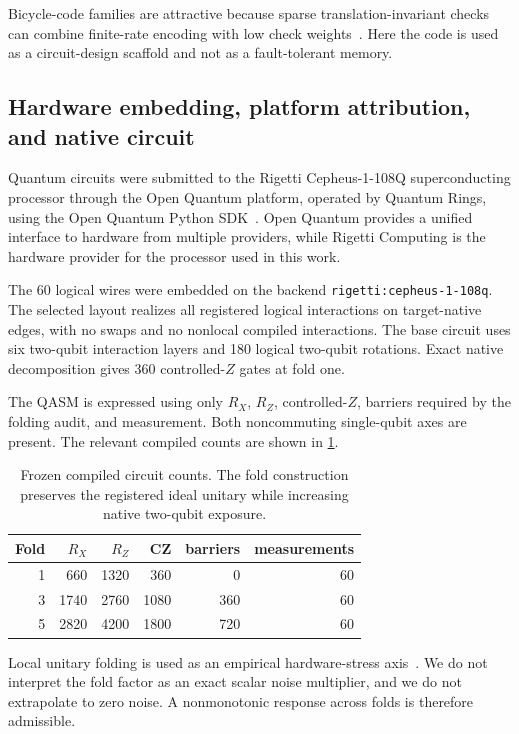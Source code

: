\documentclass[11pt]{article}
\begin{document}
Bicycle-code families are attractive because sparse translation-invariant checks can combine finite-rate encoding with low check weights~\cite{bravyi2024bicycle}. Here the code is used as a circuit-design scaffold and not as a fault-tolerant memory.

\subsection{Hardware embedding, platform attribution, and native circuit}
Quantum circuits were submitted to the Rigetti Cepheus-1-108Q superconducting processor through the Open Quantum platform, operated by Quantum Rings, using the Open Quantum Python SDK~\cite{openquantum,openquantumwebsite2026,rigetti2026cepheus}. Open Quantum provides a unified interface to hardware from multiple providers, while Rigetti Computing is the hardware provider for the processor used in this work.

The 60 logical wires were embedded on the backend \texttt{rigetti:cepheus-1-108q}. The selected layout realizes all registered logical interactions on target-native edges, with no swaps and no nonlocal compiled interactions. The base circuit uses six two-qubit interaction layers and 180 logical two-qubit rotations. Exact native decomposition gives 360 controlled-$Z$ gates at fold one.

The QASM is expressed using only $R_X$, $R_Z$, controlled-$Z$, barriers required by the folding audit, and measurement. Both noncommuting single-qubit axes are present. The relevant compiled counts are shown in \cref{tab:compiled-counts}.

\begin{table}[t]
\centering
\caption{Frozen compiled circuit counts. The fold construction preserves the registered ideal unitary while increasing native two-qubit exposure.}
\label{tab:compiled-counts}
\begin{tabular}{@{}rrrrrr@{}}
\toprule
Fold & $R_X$ & $R_Z$ & CZ & barriers & measurements \\
\midrule
1 & 660 & 1320 & 360 & 0 & 60 \\
3 & 1740 & 2760 & 1080 & 360 & 60 \\
5 & 2820 & 4200 & 1800 & 720 & 60 \\
\bottomrule
\end{tabular}
\end{table}

Local unitary folding is used as an empirical hardware-stress axis~\cite{giurgica2020zne}. We do not interpret the fold factor as an exact scalar noise multiplier, and we do not extrapolate to zero noise. A nonmonotonic response across folds is therefore admissible.
\end{document}
